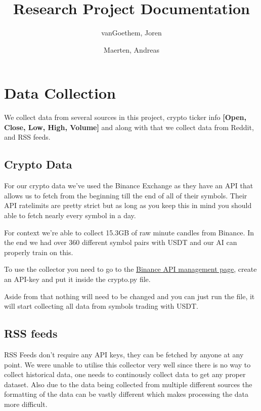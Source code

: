 \documentclass[12pt,a4paper]{article}
\begin{document}
\begin{titlepage}
    \author{
        vanGoethem, Joren
        \and
        Maerten, Andreas
    }
    \title{Research Project Documentation}
\end{titlepage}

\maketitle
\newpage
\tableofcontents
\newpage


\section{Data Collection}

We collect data from several sources in this project, crypto ticker info \textbf{[Open, Close, Low, High, Volume]} and along with that we collect data from Reddit, and RSS feeds.

\subsection{Crypto Data}

For our crypto data we've used the Binance Exchange as they have an API that allows us to fetch from the beginning till the end of all of their symbols.
Their API ratelimits are pretty strict but as long as you keep this in mind you should able to fetch nearly every symbol in a day.

For context we're able to collect 15.3GB of raw minute candles from Binance.
In the end we had over 360 different symbol pairs with USDT and our AI can properly train on this.

To use the collector you need to go to the \href{https://www.binance.com/en/my/settings/api-management}{Binance API management page}, create an API-key and put it inside the crypto.py file.

Aside from that nothing will need to be changed and you can just run the file, it will start collecting all data from symbols trading with USDT.

\subsection{RSS feeds}

RSS Feeds don't require any API keys, they can be fetched by anyone at any point. We were unable to utilise this collector very well since there is no way to collect historical data, one needs to continously collect data to get any proper dataset. Also due to the data being collected from multiple different sources the formatting of the data can be vastly different which makes processing the data more difficult.
\end{document}
